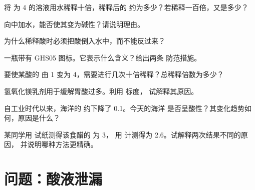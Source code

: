 \begin{exercise}[$\star\star$]\label{exo:g9:acids-bases-ph:5}
将  为 4 的溶液用水稀释十倍，稀释后的 
约为多少？若稀释一百倍，又是多少？
\end{exercise}

\begin{exercise}[$\star\star$]\label{exo:g9:acids-bases-ph:6}
向中加水，能否使其变为碱性？请说明理由。
\end{exercise}

\begin{exercise}[$\star\star$]\label{exo:g9:acids-bases-ph:7}
为什么稀释酸时必须把酸倒入水中，而不能反过来？
\end{exercise}

\begin{exercise}[$\star\star$]\label{exo:g9:acids-bases-ph:8}
一瓶带有 GHS05 图标。它表示什么含义？给出两条
防范措施。
\end{exercise}

\begin{exercise}[$\star\star$]\label{exo:g9:acids-bases-ph:9}
要使某酸的  由 1 变为
4，需要进行几次十倍稀释？总稀释倍数为多少？
\end{exercise}

\begin{exercise}[$\star\star$]\label{exo:g9:acids-bases-ph:10}
氢氧化镁乳剂用于缓解胃酸过多。利用  标度，
试解释其原因。
\end{exercise}

\begin{exercise}[$\star\star\star$]\label{exo:g9:acids-bases-ph:11}
自工业时代以来，海洋的  约下降了 0.1。今天的海洋
是否呈酸性？其变化趋势如何，原因是什么？
\end{exercise}

\begin{exercise}[$\star\star\star$]\label{exo:g9:acids-bases-ph:12}
某同学用  试纸测得该食醋的  为 3，
用  计测得为 2.6。试解释两次结果不同的原因，
并说明哪种方法更精确。
\end{exercise}

\section{问题：酸液泄漏}

